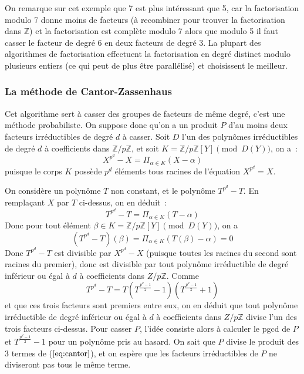 \documentclass[a4paper,11pt]{article}
\begin{document}
\begin{giacjshere}
On remarque sur cet exemple que 7 est plus intéressant que 5, car
la factorisation modulo 7 donne moins de facteurs (à recombiner pour
trouver la factorisation dans $\mathbb{Z}$) et la factorisation est
complète modulo 7 alors que modulo 5 il faut casser le facteur de
degré 6 en deux facteurs de degré 3. La plupart des algorithmes
de factorisation effectuent la factorisation en degré distinct
modulo plusieurs entiers (ce qui peut de plus être parallélisé)
et choisissent le meilleur.

\subsubsection{La méthode de Cantor-Zassenhaus}
Cet algorithme sert à casser des groupes de facteurs de même degré,
c'est une méthode probabiliste. On suppose donc qu'on a un produit $P$
d'au moins deux facteurs irréductibles de degré $d$ à casser.
Soit $D$ l'un des polynômes irréductibles de degré $d$ à coefficients
dans $\mathbb{Z}/p\mathbb{Z}$, et soit $K=\mathbb{Z}/p\mathbb{Z}[Y] \pmod {D(Y)}$, on a~:
\[X^{p^d}-X=\Pi_{\alpha \in K }(X-\alpha) \]
puisque le corps $K$ possède $p^d$ éléments tous racines
de l'équation $X^{p^d}=X$.

On considère un polynôme $T$ non constant, et le polynôme
$T^{p^d}-T$. En remplaçant $X$ par $T$ ci-dessus, on en déduit~:
\[T^{p^d}-T=\Pi_{\alpha \in K }(T-\alpha) \]
Donc pour tout élément $\beta \in K=\mathbb{Z}/p\mathbb{Z}[Y] \pmod {D(Y)}$, on a
\[(T^{p^d}-T)(\beta)=\Pi_{\alpha \in K }(T(\beta)-\alpha)=0\]
Donc $T^{p^d}-T$ est divisible par $X^{p^d}-X$ (puisque toutes les racines
du second sont racines du premier), donc est divisible par tout polynôme
irréductible de degré inférieur ou égal à $d$ à coefficients dans $Z/p\mathbb{Z}$.
Comme
\begin{equation} \label{eq:cantor}
T^{p^d}-T=T(T^{\frac{p^d-1}{2}}-1)(T^{\frac{p^d-1}{2}}+1)
\end{equation}
et que ces trois facteurs sont premiers entre eux, on en déduit que tout 
polynôme irréductible de degré inférieur ou égal à $d$ à coefficients dans 
$Z/p\mathbb{Z}$ divise l'un des trois facteurs ci-dessus. Pour casser $P$, l'idée
consiste alors à calculer le pgcd de $P$ et $T^{\frac{p^d-1}{2}}-1$
pour un polynôme pris au hasard. On sait que $P$ divise le produit des
3 termes de (\(\ref{eq:cantor}\)), et on espère que les facteurs irréductibles
de $P$ ne diviseront pas tous le même terme.


\end{giacjshere}
\end{document}
